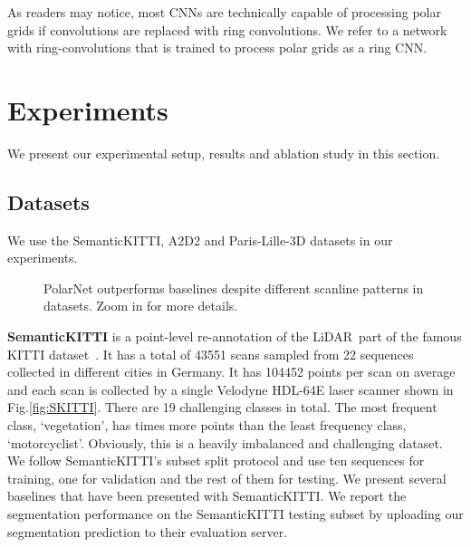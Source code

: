 \documentclass[10pt,twocolumn,letterpaper]{article}
\newcommand{\lidar}{\mbox{LiDAR }}
\begin{document}
As readers may notice, most CNNs are technically capable of processing polar grids if convolutions are replaced with ring convolutions. We refer to a network with ring-convolutions that is trained to process polar grids as a ring CNN. 

\section{Experiments}

We present our experimental setup, results and ablation study in this section.

\subsection{Datasets}

We use the SemanticKITTI\cite{behley2019iccv}, A2D2\cite{aev2019} and Paris-Lille-3D\cite{roynard2018paris} datasets in our experiments.

\begin{figure}
\centering

\quad
{}
\quad
{}
\quad
\caption{PolarNet outperforms baselines despite different scanline patterns in datasets. Zoom in for more details.}
\vspace{-15pt}
\label{fig:dataset_visualization}
\end{figure}

\textbf{SemanticKITTI} is a point-level re-annotation of the \lidar part of the famous KITTI dataset~\cite{geiger2012cvpr}. It has a total of 43551 scans sampled from 22 sequences collected in different cities in Germany. It has 104452 points per scan on average and each scan is collected by a single  Velodyne HDL-64E laser scanner shown in Fig.\ref{fig:SKITTI}. There are 19 challenging classes in total. The most frequent class, `vegetation', has  times more points than the least frequency class, `motorcyclist'. Obviously, this is a heavily imbalanced and challenging dataset. We follow SemanticKITTI’s subset split protocol and use ten sequences for training, one for validation and the rest of them for testing. We present several baselines that have been presented with SemanticKITTI.  We report the segmentation performance on the SemanticKITTI testing subset by uploading our segmentation prediction to their evaluation server.
\end{document}
